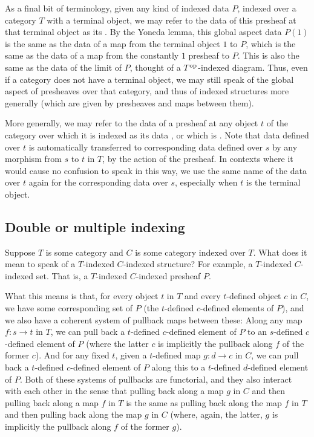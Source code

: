 As a final bit of terminology, given any kind of indexed data $P$, indexed over a category $T$ with a terminal object, we may refer to the data of this presheaf at that terminal object as its . By the Yoneda lemma, this global aspect data $P(1)$ is the same as the data of a map from the terminal object $1$ to $P$, which is the same as the data of a map from the constantly $1$ presheaf to $P$. This is also the same as the data of the limit of $P$, thought of a $T^{\mathrm{op}}$-indexed diagram. Thus, even if a category does not have a terminal object, we may still speak of the global aspect of presheaves over that category, and thus of indexed structures more generally (which are given by presheaves and maps between them).


More generally, we may refer to the data of a presheaf at any object $t$ of the category over which it is indexed as its data , or which is . Note that data defined over $t$ is automatically transferred to corresponding data defined over $s$ by any morphism from $s$ to $t$ in $T$, by the action of the presheaf. In contexts where it would cause no confusion to speak in this way, we use the same name of the data over $t$ again for the corresponding data over $s$, especially when $t$ is the terminal object. 

\subsection{Double or multiple indexing}
Suppose $T$ is some category and $C$ is some category indexed over $T$. What does it mean to speak of a $T$-indexed $C$-indexed structure? For example, a $T$-indexed $C$-indexed set. That is, a $T$-indexed $C$-indexed presheaf $P$.

What this means is that, for every object $t$ in $T$ and every $t$-defined object $c$ in $C$, we have some corresponding set of $P$ (the $t$-defined $c$-defined elements of $P$), and we also have a coherent system of pullback maps between these: Along any map $f : s \to t$ in $T$, we can pull back a $t$-defined $c$-defined element of $P$ to an $s$-defined $c$-defined element of $P$ (where the latter $c$ is implicitly the pullback along $f$ of the former $c$). And for any fixed $t$, given a $t$-defined map $g : d \to c$ in $C$, we can pull back a $t$-defined $c$-defined element of $P$ along this to a $t$-defined $d$-defined element of $P$. Both of these systems of pullbacks are functorial, and they also interact with each other  in the sense that pulling back along a map $g$ in $C$ and then pulling back along a map $f$ in $T$ is the same as pulling back along the map $f$ in $T$ and then pulling back along the map $g$ in $C$ (where, again, the latter, $g$ is implicitly the pullback along $f$ of the former $g$).


